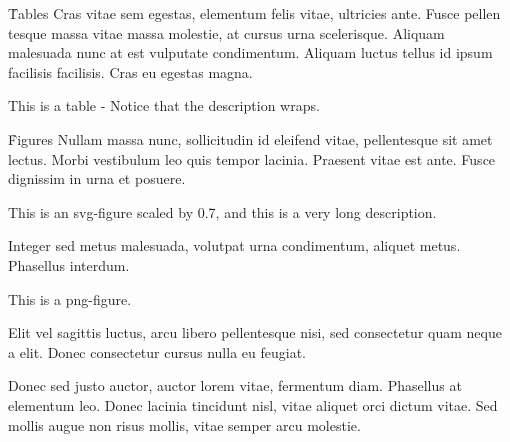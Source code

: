 \documentclass{ieee_modern}
\begin{document}

\h{Tables}
Cras vitae sem egestas, elementum felis vitae, ultricies ante. Fusce pellen tesque massa vitae massa molestie, at cursus urna scelerisque. Aliquam malesuada nunc at est vulputate condimentum. Aliquam luctus tellus id ipsum facilisis facilisis. Cras eu egestas magna.

    {This is a table - Notice that the description wraps.}

\h{Figures}
Nullam massa nunc, sollicitudin id eleifend vitae, pellentesque sit amet lectus. Morbi vestibulum leo quis tempor lacinia. Praesent vitae est ante. Fusce dignissim in urna et posuere.

    {This is an svg-figure scaled by 0.7, and this is a very long description.}

Integer sed metus malesuada, volutpat urna condimentum, aliquet metus. Phasellus interdum.

    {This is a png-figure.}

 Elit vel sagittis luctus, arcu libero pellentesque nisi, sed consectetur quam neque a elit. Donec consectetur cursus nulla eu feugiat.


Donec sed justo auctor, auctor lorem vitae, fermentum diam. Phasellus at elementum leo. Donec lacinia tincidunt nisl, vitae aliquet orci dictum vitae. Sed mollis augue non risus mollis, vitae semper arcu molestie.

\end{document}
